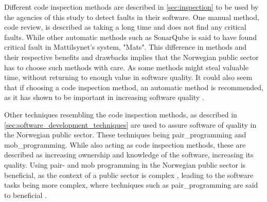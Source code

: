 Different code inspection methods are described in \autoref{sec:inspection} to be used by the agencies of this study to detect faults in their software. One manual method, code review, is described as taking a long time and does not find any critical faults. While other automatic methods such as SonarQube is said to have found critical fault in Mattilsynet's system, "Mats". This difference in methods and their respective benefits and drawbacks implies that the Norwegian public sector has to choose such methods with care. As some methods might steal valuable time, without returning to enough value in software quality. It could also seem that if choosing a code inspection method, an automatic method is recommended, as it has shown to be important in increasing software quality \cite{smm_2018}.


Other techniques resembling the code inspection methods, as described in \autoref{sec:software_development_techniques} are used to assure software of quality in the Norwegian public sector. These techniques being \gls{pair_programming} and \gls{mob_programming}. While also acting as code inspection methods, these are described as increasing ownership and knowledge of the software, increasing its quality. Using pair- and mob programming in the Norwegian public sector is beneficial, as the context of a public sector is complex \cite{jc_2010}, leading to the software tasks being more complex, where techniques such as \gls{pair_programming} are said to beneficial \cite{jeh_2009}. 


